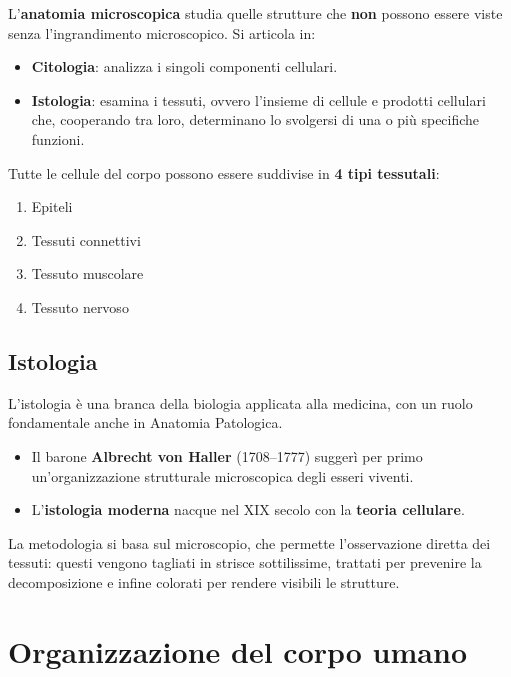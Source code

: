 L'\textbf{anatomia microscopica} studia quelle strutture che \textbf{non} possono essere viste senza l'ingrandimento microscopico. Si articola in:

\begin{itemize}
  \item \textbf{Citologia}: analizza i singoli componenti cellulari.
  \item \textbf{Istologia}: esamina i tessuti, ovvero l'insieme di cellule e prodotti cellulari che, cooperando tra loro, determinano lo svolgersi di una o più specifiche funzioni.
\end{itemize}

Tutte le cellule del corpo possono essere suddivise in \textbf{4 tipi tessutali}:
\begin{enumerate}
  \item Epiteli
  \item Tessuti connettivi
  \item Tessuto muscolare
  \item Tessuto nervoso
\end{enumerate}

\subsection{Istologia}

L'istologia è una branca della biologia applicata alla medicina, con un ruolo fondamentale anche in Anatomia Patologica.

\begin{itemize}
  \item Il barone \textbf{Albrecht von Haller} (1708--1777) suggerì per primo un'organizzazione strutturale microscopica degli esseri viventi.
  \item L'\textbf{istologia moderna} nacque nel XIX secolo con la \textbf{teoria cellulare}.
\end{itemize}

La metodologia si basa sul microscopio, che permette l'osservazione diretta dei tessuti: questi vengono tagliati in strisce sottilissime, trattati per prevenire la decomposizione e infine colorati per rendere visibili le strutture.

\section{Organizzazione del corpo umano}

